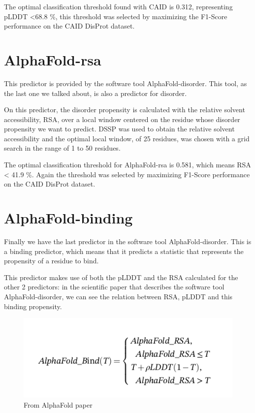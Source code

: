 The optimal classification threshold found with CAID is 0.312, representing pLDDT <68.8 \%, this threshold was selected by maximizing the F1-Score performance on the CAID DisProt dataset.
\section{AlphaFold-rsa}
This predictor is provided by the software tool AlphaFold-disorder. This tool, as the last one we talked about, is also a predictor for disorder.

On this predictor, the disorder propensity is calculated with the relative solvent accessibility, RSA, over a local window centered on the residue whose disorder propensity we want to predict. DSSP was used to obtain the relative solvent accessibility and the optimal local window, of 25 residues, was chosen with a grid search in the range of 1 to 50 residues.

The optimal classification threshold for AlphaFold-rsa is 0.581, which means RSA < 41.9 \%. Again the threshold was selected by maximizing F1-Score performance on the CAID DisProt dataset.

\pagebreak

\section{AlphaFold-binding}
Finally we have the last predictor in the software tool AlphaFold-disorder. This is a binding predictor, which means that it predicts a statistic that represents the propensity of a residue to bind.

This predictor makes use of both the pLDDT and the RSA calculated for the other 2 predictors: in the scientific paper \cite{alphafold-disorder} that describes the software tool AlphaFold-disorder, we can see the relation between RSA, pLDDT and this binding propensity.
\begin{figure}
    \centering
    \includegraphics[scale=.7]{res/alphafold-binding.png}
    \caption{From AlphaFold paper}
    \label{fig:enter-label}
\end{figure}


